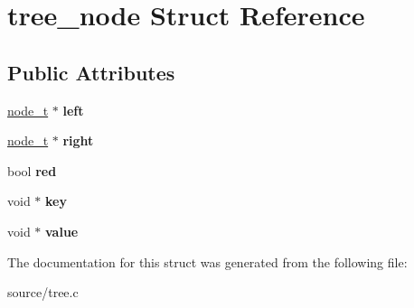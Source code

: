 \hypertarget{structtree__node}{}\section{tree\+\_\+node Struct Reference}
\label{structtree__node}
\subsection*{Public Attributes}
\begin{DoxyCompactItemize}
\item 
\hyperlink{structtree__node}{node\+\_\+t} $\ast$ {\bfseries left}\hypertarget{structtree__node_a477f16f71fe613f0b7f12d579c347a66}{}\label{structtree__node_a477f16f71fe613f0b7f12d579c347a66}

\item 
\hyperlink{structtree__node}{node\+\_\+t} $\ast$ {\bfseries right}\hypertarget{structtree__node_a4ac88e52bfd0780cc56d64280b621f14}{}\label{structtree__node_a4ac88e52bfd0780cc56d64280b621f14}

\item 
bool {\bfseries red}\hypertarget{structtree__node_afb1e6333e6a62e6f3e175531f735f827}{}\label{structtree__node_afb1e6333e6a62e6f3e175531f735f827}

\item 
void $\ast$ {\bfseries key}\hypertarget{structtree__node_a980973caff9cbaa4ba90097265288d8a}{}\label{structtree__node_a980973caff9cbaa4ba90097265288d8a}

\item 
void $\ast$ {\bfseries value}\hypertarget{structtree__node_a4b3d019e7f4a2bb003c5edb133b027b4}{}\label{structtree__node_a4b3d019e7f4a2bb003c5edb133b027b4}

\end{DoxyCompactItemize}


The documentation for this struct was generated from the following file\+:\begin{DoxyCompactItemize}
\item 
source/tree.\+c\end{DoxyCompactItemize}

